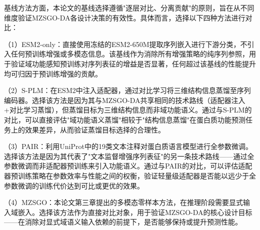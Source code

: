 基线方法方面，本论文的基线选择遵循"逐层对比、分离贡献"的原则，旨在从不同维度验证MZSGO-DA各设计决策的有效性。具体而言，选择以下四种方法进行对比：

（1）ESM2-only：直接使用冻结的ESM2-650M提取序列嵌入进行下游分类，不引入任何预训练增强或多模态信息。该基线作为消除所有增强策略的纯序列参照，用于验证域功能感知预训练对序列表征的增益是否显著，任何超过该基线的性能提升均可归因于预训练增强的贡献。

（2）S-PLM\cite{wang2025splm}：在ESM2中注入适配器，通过对比学习将三维结构信息蒸馏至序列编码器。选择该方法是因为其与MZSGO-DA共享相同的技术路线（适配器注入+对比学习蒸馏），但蒸馏目标为三维结构信息而非域功能语义。通过与S-PLM的对比，可以直接评估"域功能语义蒸馏"相较于"结构信息蒸馏"在蛋白质功能预测任务上的效果差异，从而验证蒸馏目标选择的合理性。

（3）PAIR\cite{duan2025pair}：利用UniProt中的19类文本注释对蛋白质语言模型进行全参数微调。选择该方法是因为其代表了"文本监督增强序列表征"的另一条技术路线——通过全参数微调而非适配器预训练来引入功能语义。通过与PAIR的对比，可以评估适配器预训练策略在参数效率与性能之间的权衡，验证轻量级适配器是否能以远少于全参数微调的训练代价达到可比或更优的效果。

（4）MZSGO：本论文第三章提出的多模态零样本方法，在推理阶段需要显式输入域嵌入。选择该方法作为直接对比对象，用于验证MZSGO-DA的核心设计目标——在消除对显式域语义输入依赖的前提下，是否能够保持或提升预测性能。

